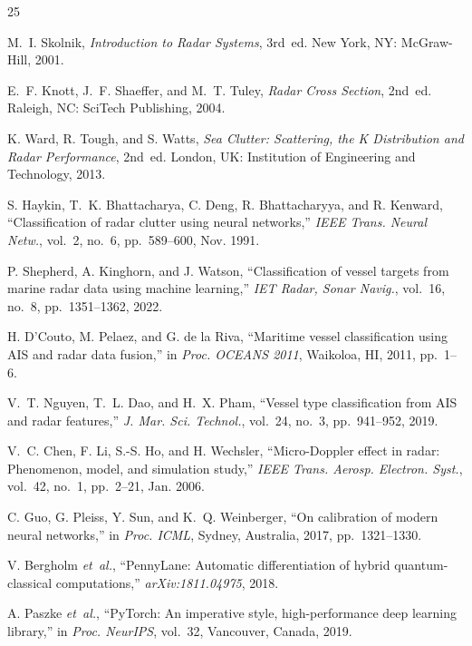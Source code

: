 \documentclass[journal]{IEEEtran}
\begin{document}

\begin{thebibliography}{25}

M.~I. Skolnik, \textit{Introduction to Radar Systems}, 3rd~ed.
New York, NY: McGraw-Hill, 2001.

E.~F. Knott, J.~F. Shaeffer, and M.~T. Tuley, \textit{Radar Cross Section},
2nd~ed. Raleigh, NC: SciTech Publishing, 2004.

K. Ward, R. Tough, and S. Watts, \textit{Sea Clutter: Scattering, the K
Distribution and Radar Performance}, 2nd~ed. London, UK: Institution of
Engineering and Technology, 2013.

S. Haykin, T.~K. Bhattacharya, C. Deng, R. Bhattacharyya, and R. Kenward,
``Classification of radar clutter using neural networks,''
\textit{IEEE Trans. Neural Netw.}, vol.~2, no.~6, pp.~589--600, Nov. 1991.

P. Shepherd, A. Kinghorn, and J. Watson,
``Classification of vessel targets from marine radar data using machine
learning,'' \textit{IET Radar, Sonar Navig.}, vol.~16, no.~8,
pp.~1351--1362, 2022.

H. D'Couto, M. Pelaez, and G. de la Riva,
``Maritime vessel classification using AIS and radar data fusion,''
in \textit{Proc. OCEANS 2011}, Waikoloa, HI, 2011, pp.~1--6.

V.~T. Nguyen, T.~L. Dao, and H.~X. Pham,
``Vessel type classification from AIS and radar features,''
\textit{J. Mar. Sci. Technol.}, vol.~24, no.~3, pp.~941--952, 2019.

V.~C. Chen, F. Li, S.-S. Ho, and H. Wechsler,
``Micro-Doppler effect in radar: Phenomenon, model, and simulation study,''
\textit{IEEE Trans. Aerosp. Electron. Syst.}, vol.~42, no.~1,
pp.~2--21, Jan. 2006.

C. Guo, G. Pleiss, Y. Sun, and K.~Q. Weinberger,
``On calibration of modern neural networks,''
in \textit{Proc. ICML}, Sydney, Australia, 2017, pp.~1321--1330.

V. Bergholm \textit{et~al.},
``PennyLane: Automatic differentiation of hybrid quantum-classical
computations,'' \textit{arXiv:1811.04975}, 2018.

A. Paszke \textit{et~al.},
``PyTorch: An imperative style, high-performance deep learning library,''
in \textit{Proc. NeurIPS}, vol.~32, Vancouver, Canada, 2019.


\end{thebibliography}
\end{document}
